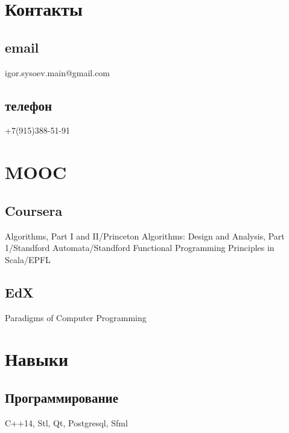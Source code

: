\documentclass[a4paper]{curricula-vitae}
\begin{document}




\begin{minipage}[t]{0.33\textwidth} %

\section{Контакты} 
\subsection{email}
igor.sysoev.main@gmail.com
\subsection{телефон}
+7(915)388-51-91

\section{MOOC}
\subsection{Coursera}
Algorithms, Part I and II/Princeton
Algorithms: Design and Analysis, Part 1/Standford
Automata/Standford
Functional Programming Principles in Scala/EPFL

\subsection{EdX}
Paradigms of Computer Programming

\section{Навыки}

\subsection{Программирование}
C++14, Stl, Qt,
Postgresql, Sfml


\end{minipage}
\end{document}
